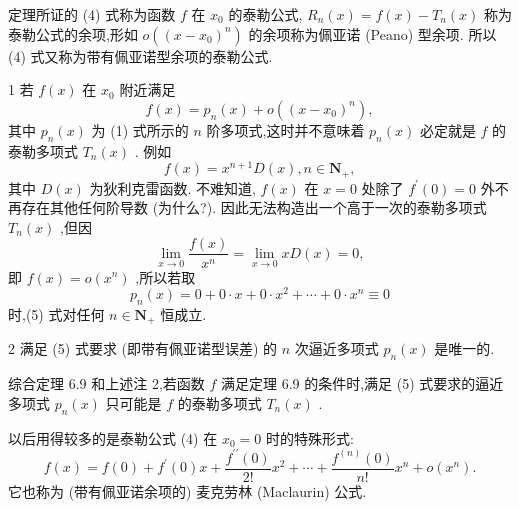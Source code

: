 定理所证的 (4) 式称为函数 \(f\) 在 \({x}_{0}\) 的泰勒公式, \({R}_{n}\left( x\right)  = f\left( x\right)  - {T}_{n}\left( x\right)\) 称为泰勒公式的余项,形如 \(o\left( {\left( x - {x}_{0}\right) }^{n}\right)\) 的余项称为佩亚诺 (Peano) 型余项. 所以 (4) 式又称为带有佩亚诺型余项的泰勒公式.

\begin{remark}
1 若 \(f\left( x\right)\) 在 \({x}_{0}\) 附近满足
\[
f\left( x\right)  = {p}_{n}\left( x\right)  + o\left( {\left( x - {x}_{0}\right) }^{n}\right) , \tag{5}
\]
其中 \({p}_{n}\left( x\right)\) 为 (1) 式所示的 \(n\) 阶多项式,这时并不意味着 \({p}_{n}\left( x\right)\) 必定就是 \(f\) 的泰勒多项式 \({T}_{n}\left( x\right)\) . 例如
\[
f\left( x\right)  = {x}^{n + 1}D\left( x\right) ,n \in  {\mathbf{N}}_{ + },
\]
其中 \(D\left( x\right)\) 为狄利克雷函数. 不难知道, \(f\left( x\right)\) 在 \(x = 0\) 处除了 \({f}^{\prime }\left( 0\right)  = 0\) 外不再存在其他任何阶导数 (为什么?). 因此无法构造出一个高于一次的泰勒多项式 \({T}_{n}\left( x\right)\) ,但因
\[
\mathop{\lim }\limits_{{x \rightarrow  0}}\frac{f\left( x\right) }{{x}^{n}} = \mathop{\lim }\limits_{{x \rightarrow  0}}{xD}\left( x\right)  = 0,
\]
即 \(f\left( x\right)  = o\left( {x}^{n}\right)\) ,所以若取
\[
{p}_{n}\left( x\right)  = 0 + 0 \cdot  x + 0 \cdot  {x}^{2} + \cdots  + 0 \cdot  {x}^{n} \equiv  0
\]
时,(5) 式对任何 \(n \in  {\mathbf{N}}_{ + }\) 恒成立.
\end{remark}


\begin{remark}
2 满足 (5) 式要求 (即带有佩亚诺型误差) 的 \(n\) 次逼近多项式 \({p}_{n}\left( x\right)\) 是唯一的.

综合定理 6.9 和上述注 2,若函数 \(f\) 满足定理 6.9 的条件时,满足 (5) 式要求的逼近多项式 \({p}_{n}\left( x\right)\) 只可能是 \(f\) 的泰勒多项式 \({T}_{n}\left( x\right)\) .

以后用得较多的是泰勒公式 (4) 在 \({x}_{0} = 0\) 时的特殊形式:
\[
f\left( x\right)  = f\left( 0\right)  + {f}^{\prime }\left( 0\right) x + \frac{{f}^{\prime \prime }\left( 0\right) }{2!}{x}^{2} + \cdots  + \frac{{f}^{\left( n\right) }\left( 0\right) }{n!}{x}^{n} + o\left( {x}^{n}\right) . \tag{6}
\]
它也称为 (带有佩亚诺余项的) 麦克劳林 (Maclaurin) 公式.
\end{remark}



